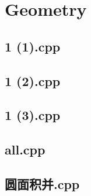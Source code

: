 \section{Geometry}

\subsection{1 (1).cpp}


\subsection{1 (2).cpp}


\subsection{1 (3).cpp}


\subsection{all.cpp}


\subsection{圆面积并.cpp}


